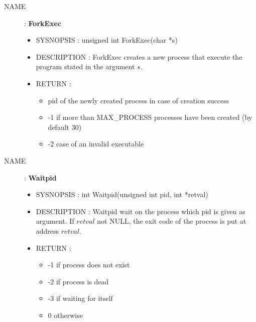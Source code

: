 \begin{description}
    \item [NAME] : \textbf{ForkExec}
        \begin{itemize}
            \item SYSNOPSIS : unsigned int ForkExec(char *s)
            \item DESCRIPTION :
                ForkExec creates a new process that execute the program stated in the argument $s$.
            \item RETURN :
                \begin{itemize}
                    \item pid of the newly created process in case of creation success
                    \item -1 if more than MAX\_PROCESS processes have been created (by default 30)
                    \item -2 case of an invalid executable
                \end{itemize}
        \end{itemize}

    \item [NAME] : \textbf{Waitpid}
        \begin{itemize}
            \item SYSNOPSIS : int Waitpid(unsigned int pid, int *retval)
            \item DESCRIPTION :
                Waitpid wait on the process which pid is given as argument.
                If $retval$ not NULL, the exit code of the process is put at address $retval$.
            \item RETURN :
                \begin{itemize}
                    \item -1 if process does not exist
                    \item -2 if process is dead
                    \item -3 if waiting for itself
                    \item 0 otherwise
                \end{itemize}
        \end{itemize}


\end{description}
